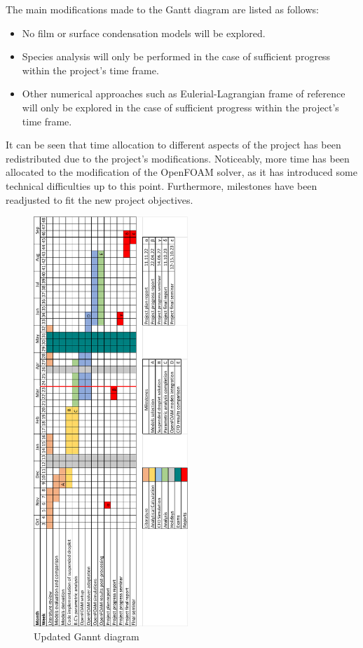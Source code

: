 \documentclass[12pt]{article}
\begin{document}
\noindent
The main modifications made to the Gantt diagram are listed as follows:
\begin{itemize}
    \item No film or surface condensation models will be explored.
    \item Species analysis will only be performed in the case of sufficient progress within the project's time frame.
    \item Other numerical approaches such as Eulerial-Lagrangian frame of reference will only be explored in the case of sufficient progress within the project's time frame.
\end{itemize} 
It can be seen that time allocation to different aspects of the project has been redistributed due to the project's modifications. Noticeably, more time has been allocated to the modification of the OpenFOAM solver, as it has introduced some technical difficulties up to this point. Furthermore, milestones have been readjusted to fit the new project objectives. 
\begin{figure}[H]
    \centering
    \includegraphics[width=0.52\textwidth]{Figures/Gantt.png}
    \caption{Updated Gannt diagram}
    \label{f:Gannt}
\end{figure}
\newpage
\end{document}
